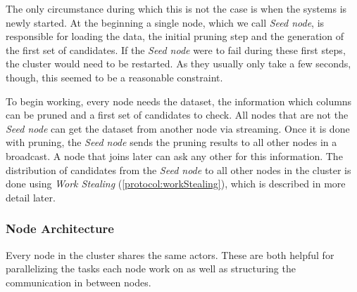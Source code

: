 The only circumstance during which this is not the case is when the systems is newly started. 
At the beginning a single node, which we call \emph{Seed node}, is responsible for loading the data, the initial pruning step and the generation of the first set of candidates. 
If the \emph{Seed node} were to fail during these first steps, the cluster would need to be restarted. 
As they usually only take a few seconds, though, this seemed to be a reasonable constraint.

To begin working, every node needs the dataset, the information which columns can be pruned and a first set of candidates to check. 
All nodes that are not the \emph{Seed node} can get the dataset from another node via streaming. 
Once it is done with pruning, the \emph{Seed node} sends the pruning results to all other nodes in a broadcast.
A node that joins later can ask any other for this information.
The distribution of candidates from the \emph{Seed node} to all other nodes in the cluster is done using \emph{Work Stealing} (\cref{protocol:workStealing}), which is described in more detail later.

\subsubsection{Node Architecture}
Every node in the cluster shares the same actors.
These are both helpful for parallelizing the tasks each node work on as well as structuring the communication in between nodes.

